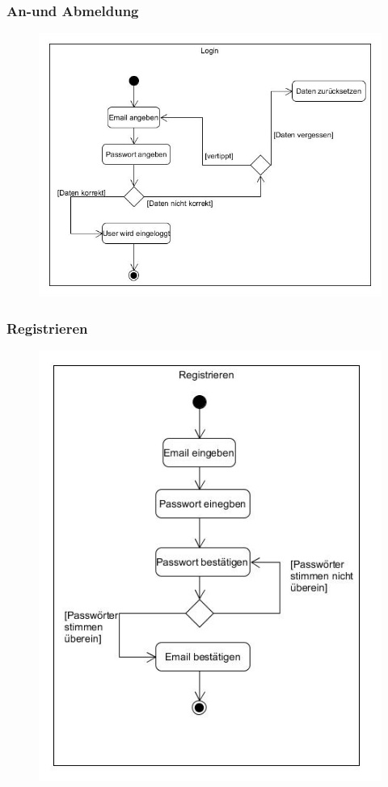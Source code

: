 		\subsubsection{An-und Abmeldung}
		
			\begin{figure}[H]
				\includegraphics[scale=0.6]{images/UC1Activity}
			\end{figure}
		
		\subsubsection{Registrieren}
		
			\begin{figure}[H]
				\includegraphics[scale=0.6]{images/UC2Activity}
			\end{figure}
		
